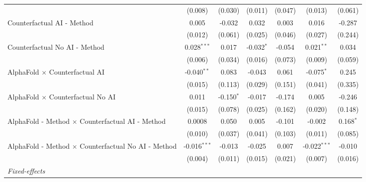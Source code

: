 \begin{tabular}{lcccccc}
                                                              & (0.008)        & (0.030)      & (0.011)       & (0.047)      & (0.013)        & (0.061)\\   
   Counterfactual AI - Method                                 & 0.005          & -0.032       & 0.032         & 0.003        & 0.016          & -0.287\\   
                                                              & (0.012)        & (0.061)      & (0.025)       & (0.046)      & (0.027)        & (0.244)\\   
   Counterfactual No AI - Method                              & 0.028$^{***}$  & 0.017        & -0.032$^{*}$  & -0.054       & 0.021$^{**}$   & 0.034\\   
                                                              & (0.006)        & (0.034)      & (0.016)       & (0.073)      & (0.009)        & (0.059)\\   
   AlphaFold $\times$ Counterfactual AI                       & -0.040$^{**}$  & 0.083        & -0.043        & 0.061        & -0.075$^{*}$   & 0.245\\   
                                                              & (0.015)        & (0.113)      & (0.029)       & (0.151)      & (0.041)        & (0.335)\\   
   AlphaFold $\times$ Counterfactual No AI                    & 0.011          & -0.150$^{*}$ & -0.017        & -0.174       & 0.005          & -0.246\\   
                                                              & (0.015)        & (0.078)      & (0.025)       & (0.162)      & (0.020)        & (0.148)\\   
   AlphaFold - Method $\times$ Counterfactual AI - Method     & 0.0008         & 0.050        & 0.005         & -0.101       & -0.002         & 0.168$^{*}$\\   
                                                              & (0.010)        & (0.037)      & (0.041)       & (0.103)      & (0.011)        & (0.085)\\   
   AlphaFold - Method $\times$ Counterfactual No AI - Method  & -0.016$^{***}$ & -0.013       & -0.025        & 0.007        & -0.022$^{***}$ & -0.010\\   
                                                              & (0.004)        & (0.011)      & (0.015)       & (0.021)      & (0.007)        & (0.016)\\   
   \midrule
   \emph{Fixed-effects}\\

\end{tabular}
